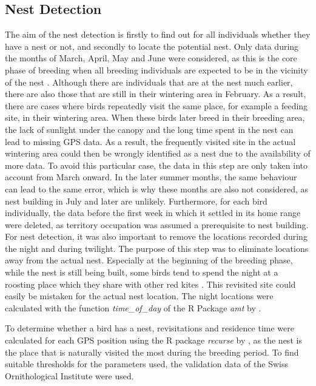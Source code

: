\subsection{Nest Detection} \label{subsection:nest}
The aim of the nest detection is firstly to find out for all individuals whether they have a nest or not, and secondly to locate the potential nest. Only data during the months of March, April, May and June were considered, as this is the core phase of breeding when all breeding individuals are expected to be in the vicinity of the nest \parencite{aebischer2021rotmilan}. Although there are individuals that are at the nest much earlier, there are also those that are still in their wintering area in February. As a result, there are cases where birds repeatedly visit the same place, for example a feeding site, in their wintering area. When these birds later breed in their breeding area, the lack of sunlight under the canopy and the long time spent in the nest can lead to missing GPS data. As a result, the frequently visited site in the actual wintering area could then be wrongly identified as a nest due to the availability of more data. To avoid this particular case, the data in this step are only taken into account from March onward. In the later summer months, the same behaviour can lead to the same error, which is why these months are also not considered, as nest building in July and later are unlikely. Furthermore, for each bird individually, the data before the first week in which it settled in its home range were deleted, as territory occupation was assumed a prerequisite to nest building. For nest detection, it was also important to remove the locations recorded during the night and during twilight. The purpose of this step was to eliminate locations away from the actual nest. Especially at the beginning of the breeding phase, while the nest is still being built, some birds tend to spend the night at a roosting place which they share with other red kites \parencite{aebischer2021rotmilan}. This revisited site could easily be mistaken for the actual nest location. The night locations were calculated with the function \textit{time\_of\_day} of the R Package \textit{amt} by \textcite{signer2019amt}.

To determine whether a bird has a nest, revisitations and residence time were calculated for each GPS position using the R package \textit{recurse} by \parencite{bracis2018revisit}, as the nest is the place that is naturally visited the most during the breeding period. To find suitable thresholds for the parameters used, the validation data of the Swiss Ornithological Institute were used.

